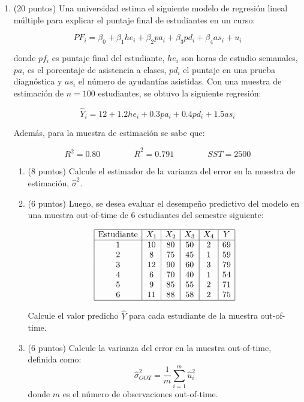 \documentclass[10pt,a4paper]{article}
\begin{document}
\begin{enumerate}
\item (20 puntos)  Una universidad estima el siguiente modelo de regresión lineal múltiple para explicar el puntaje final de estudiantes en un curso:

    \[
    PF_i=\beta_0+\beta_1he_{i}+\beta_2pa_{i}+\beta_3pd_{i}+\beta_4as_{i}+u_i
    \]

    donde \(pf_i\) es puntaje final del estudiante, \(he_{i}\) son horas de estudio semanales, \(pa_{i}\) es el porcentaje de asistencia a clases, \(pd_{i}\) el puntaje en una prueba diagnóstica y \(as_{i}\) el número de ayudantías asistidas. Con una muestra de estimación de \(n=100\) estudiantes, se obtuvo la siguiente regresión:

    \[
    \hat Y_i = 12 + 1.2he_{i} + 0.3pa_{i} + 0.4pd_{i} + 1.5as_{i}
    \]

    Además, para la muestra de estimación se sabe que:

    \[
    R^2 = 0.80
    \qquad\qquad
    \bar R^2 = 0.791
    \qquad\qquad
    SST = 2500
    \]

    \begin{enumerate}
\item (8 puntos) Calcule el estimador de la varianza del error en la muestra de estimación, \(\hat\sigma^2\).
        \item  (6 puntos)   Luego, se desea evaluar el desempeño predictivo del modelo en una muestra out-of-time de 6 estudiantes del semestre siguiente:

    \[
    \begin{array}{|c|c|c|c|c|c|}
    \hline
    \text{Estudiante} & X_1 & X_2 & X_3 & X_4 & Y \\
    \hline
    1 & 10 & 80 & 50 & 2 & 69 \\
    2 & 8 & 75 & 45 & 1 & 59 \\
    3 & 12 & 90 & 60 & 3 & 79 \\
    4 & 6 & 70 & 40 & 1 & 54 \\
    5 & 9 & 85 & 55 & 2 & 71 \\
    6 & 11 & 88 & 58 & 2 & 75 \\
    \hline
    \end{array}
    \]
        
        Calcule el valor predicho \(\hat Y\) para cada estudiante de la muestra out-of-time. 
        \item (6 puntos) Calcule la varianza del error en la muestra out-of-time, definida como:
        \[
        \hat\sigma^2_{OOT}=\frac{1}{m}\sum_{i=1}^{m}\hat u_i^2
        \]
        donde \(m\) es el número de observaciones out-of-time.
    \end{enumerate}






\end{enumerate}
\end{document}
